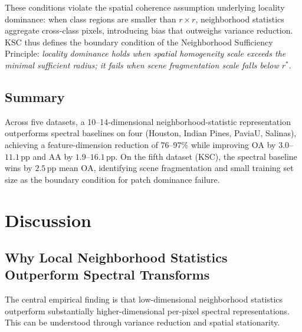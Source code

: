 \documentclass[journal]{IEEEtran}
\newcommand{\rstar}{r^{*}}
\newcommand{\pp}{\,\text{pp}}
\newcommand{\OA}{\ensuremath{\mathrm{OA}}}
\newcommand{\Acc}{\ensuremath{\mathrm{AA}}}  %
\begin{document}
These conditions violate the spatial coherence assumption underlying
locality dominance: when class regions are smaller than $r{\times}r$,
neighborhood statistics aggregate cross-class pixels, introducing
bias that outweighs variance reduction. KSC thus defines the
boundary condition of the Neighborhood Sufficiency Principle:
\emph{locality dominance holds when spatial homogeneity scale exceeds
the minimal sufficient radius; it fails when scene fragmentation
scale falls below $\rstar$}.

\subsection{Summary}

Across five datasets, a 10--14-dimensional neighborhood-statistic
representation outperforms spectral baselines on four (Houston,
Indian Pines, PaviaU, Salinas), achieving a feature-dimension
reduction of 76--97\% while improving $\OA$ by $3.0$--$11.1\pp$ and
$\Acc$ by $1.9$--$16.1\pp$. On the fifth dataset (KSC), the spectral
baseline wins by $2.5\pp$ mean $\OA$, identifying scene fragmentation
and small training set size as the boundary condition for patch
dominance failure.

\section{Discussion}
\label{sec:discussion}

\subsection{Why Local Neighborhood Statistics Outperform
            Spectral Transforms}

The central empirical finding is that low-dimensional neighborhood
statistics outperform substantially higher-dimensional per-pixel
spectral representations. This can be understood through variance
reduction and spatial stationarity.
\end{document}
